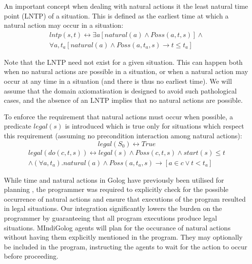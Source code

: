 \documentclass[letterpaper]{article}
\begin{document}
An important concept when dealing with natural actions it the least
natural time point (LNTP) of a situation. This is defined as the earliest
time at which a natural action may occur in a situation:
\begin{multline}
\label{eqn:lntp_def}
lntp(s,t)\leftrightarrow \exists a\left[natural(a)\wedge Poss(a,t,s)\right]\wedge\\
\forall a,t_{a}\left[natural(a)\wedge Poss(a,t_{a},s)\rightarrow t\leq t_{a}\right]
\end{multline}

Note that the LNTP need not exist for a given situation. This can
happen both when no natural actions are possible in a situation, or
when a natural action may occur at any time in a situation (and there
is thus no earliest time). We will assume that the domain axiomatisation
is designed to avoid such pathological cases, and the absence of an
LNTP implies that no natural actions are possible.

To enforce the requirement that natural actions must occur when possible,
a predicate $legal(s)$ is introduced which is true only for situations
which respect this requirement (assuming no precondition interaction
among natural actions):
\begin{equation}
\label{eqn:legal_def0}
legal(S_{0}) \leftrightarrow True
\end{equation}
\begin{multline}
\label{eqn:legal_def}
legal(do(c,t,s)) \leftrightarrow legal(s)\wedge Poss(c,t,s)\wedge start(s)\leq t\\
\wedge (\forall a,t_{a}).natural(a)\wedge Poss(a,t_{a},s)\rightarrow\left[a\in c\vee t<t_{a}\right]
\end{multline}

While time and natural actions in Golog have previously been utilised
for planning \cite{pirri00planning_nat_acts}, the programmer
was required to explicitly check for the possible occurrence of natural
actions and ensure that executions of the program resulted in legal
situations. Our integration significantly lowers the burden on the
programmer by guaranteeing that all program executions produce legal
situations.
MIndiGolog agents will plan for the occurance of natural actions
without having them explicitly mentioned in the program.  They may
optionally be included in the program, instructing the agents to wait for
the action to occur before proceeding.
\end{document}
